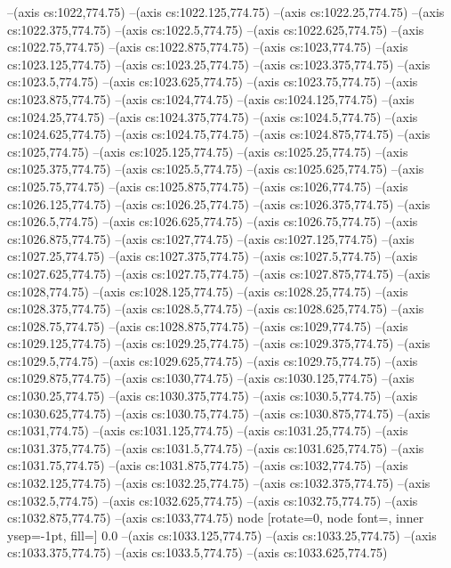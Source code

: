 --(axis cs:1022,774.75)
--(axis cs:1022.125,774.75)
--(axis cs:1022.25,774.75)
--(axis cs:1022.375,774.75)
--(axis cs:1022.5,774.75)
--(axis cs:1022.625,774.75)
--(axis cs:1022.75,774.75)
--(axis cs:1022.875,774.75)
--(axis cs:1023,774.75)
--(axis cs:1023.125,774.75)
--(axis cs:1023.25,774.75)
--(axis cs:1023.375,774.75)
--(axis cs:1023.5,774.75)
--(axis cs:1023.625,774.75)
--(axis cs:1023.75,774.75)
--(axis cs:1023.875,774.75)
--(axis cs:1024,774.75)
--(axis cs:1024.125,774.75)
--(axis cs:1024.25,774.75)
--(axis cs:1024.375,774.75)
--(axis cs:1024.5,774.75)
--(axis cs:1024.625,774.75)
--(axis cs:1024.75,774.75)
--(axis cs:1024.875,774.75)
--(axis cs:1025,774.75)
--(axis cs:1025.125,774.75)
--(axis cs:1025.25,774.75)
--(axis cs:1025.375,774.75)
--(axis cs:1025.5,774.75)
--(axis cs:1025.625,774.75)
--(axis cs:1025.75,774.75)
--(axis cs:1025.875,774.75)
--(axis cs:1026,774.75)
--(axis cs:1026.125,774.75)
--(axis cs:1026.25,774.75)
--(axis cs:1026.375,774.75)
--(axis cs:1026.5,774.75)
--(axis cs:1026.625,774.75)
--(axis cs:1026.75,774.75)
--(axis cs:1026.875,774.75)
--(axis cs:1027,774.75)
--(axis cs:1027.125,774.75)
--(axis cs:1027.25,774.75)
--(axis cs:1027.375,774.75)
--(axis cs:1027.5,774.75)
--(axis cs:1027.625,774.75)
--(axis cs:1027.75,774.75)
--(axis cs:1027.875,774.75)
--(axis cs:1028,774.75)
--(axis cs:1028.125,774.75)
--(axis cs:1028.25,774.75)
--(axis cs:1028.375,774.75)
--(axis cs:1028.5,774.75)
--(axis cs:1028.625,774.75)
--(axis cs:1028.75,774.75)
--(axis cs:1028.875,774.75)
--(axis cs:1029,774.75)
--(axis cs:1029.125,774.75)
--(axis cs:1029.25,774.75)
--(axis cs:1029.375,774.75)
--(axis cs:1029.5,774.75)
--(axis cs:1029.625,774.75)
--(axis cs:1029.75,774.75)
--(axis cs:1029.875,774.75)
--(axis cs:1030,774.75)
--(axis cs:1030.125,774.75)
--(axis cs:1030.25,774.75)
--(axis cs:1030.375,774.75)
--(axis cs:1030.5,774.75)
--(axis cs:1030.625,774.75)
--(axis cs:1030.75,774.75)
--(axis cs:1030.875,774.75)
--(axis cs:1031,774.75)
--(axis cs:1031.125,774.75)
--(axis cs:1031.25,774.75)
--(axis cs:1031.375,774.75)
--(axis cs:1031.5,774.75)
--(axis cs:1031.625,774.75)
--(axis cs:1031.75,774.75)
--(axis cs:1031.875,774.75)
--(axis cs:1032,774.75)
--(axis cs:1032.125,774.75)
--(axis cs:1032.25,774.75)
--(axis cs:1032.375,774.75)
--(axis cs:1032.5,774.75)
--(axis cs:1032.625,774.75)
--(axis cs:1032.75,774.75)
--(axis cs:1032.875,774.75)
--(axis cs:1033,774.75)
node [rotate=0, node font=\tiny, inner ysep=-1pt, fill=\bgcol] {0.0}
--(axis cs:1033.125,774.75)
--(axis cs:1033.25,774.75)
--(axis cs:1033.375,774.75)
--(axis cs:1033.5,774.75)
--(axis cs:1033.625,774.75)
